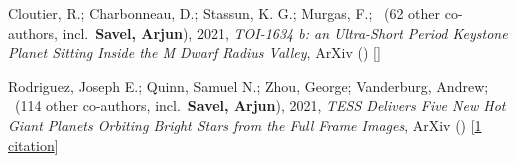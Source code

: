 \item[{\color{numcolor}\scriptsize2}] Cloutier, R.; Charbonneau, D.; Stassun, K. G.; Murgas, F.; \etal\ ({62} other co-authors, incl.\ \textbf{Savel, Arjun}), 2021, \emph{TOI-1634 b: an Ultra-Short Period Keystone Planet Sitting Inside the M Dwarf Radius Valley}, ArXiv () [\href{https://ui.adsabs.harvard.edu/abs/2021arXiv210312790C}]

\item[{\color{numcolor}\scriptsize1}] Rodriguez, Joseph E.; Quinn, Samuel N.; Zhou, George; Vanderburg, Andrew; \etal\ ({114} other co-authors, incl.\ \textbf{Savel, Arjun}), 2021, \emph{TESS Delivers Five New Hot Giant Planets Orbiting Bright Stars from the Full Frame Images}, ArXiv () [\href{https://ui.adsabs.harvard.edu/abs/2021arXiv210101726R}{1 citation}]